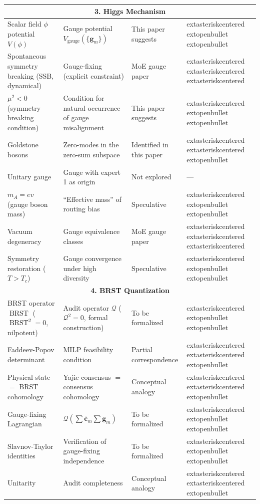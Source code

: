 \documentclass[12pt,a4paper]{article}
\theoremstyle{remark}
\newcommand{\gaugeparam}{\mathbf{g}}
\DeclareMathOperator{\BRST}{BRST}
\begin{document}
\begin{longtable}{p{4.2cm} p{5cm} p{4cm} p{2cm}}
\midrule
\multicolumn{4}{c}{\textbf{3. Higgs Mechanism}} \\
\midrule
Scalar field $\phi$ potential $V(\phi)$ & Gauge potential $V_{\text{gauge}}(\{\gaugeparam_m\})$ & This paper suggests & 	extasteriskcentered	extopenbullet	extopenbullet \\
Spontaneous symmetry breaking (SSB, dynamical) & Gauge-fixing (explicit constraint) & MoE gauge paper & 	extasteriskcentered	extasteriskcentered	extasteriskcentered \\
$\mu^2 < 0$ (symmetry breaking condition) & Condition for natural occurrence of gauge misalignment & This paper suggests & 	extasteriskcentered	extopenbullet	extopenbullet \\
Goldstone bosons & Zero-modes in the zero-sum subspace & Identified in this paper & 	extasteriskcentered	extasteriskcentered	extopenbullet \\
Unitary gauge & Gauge with expert 1 as origin & Not explored & — \\
$m_A = ev$ (gauge boson mass) & ``Effective mass'' of routing bias & Speculative & 	extasteriskcentered	extopenbullet	extopenbullet \\
Vacuum degeneracy & Gauge equivalence classes & MoE gauge paper & 	extasteriskcentered	extasteriskcentered	extasteriskcentered \\
Symmetry restoration ($T > T_c$) & Gauge convergence under high diversity & Speculative & 	extasteriskcentered	extopenbullet	extopenbullet \\

\midrule
\multicolumn{4}{c}{\textbf{4. BRST Quantization}} \\
\midrule
BRST operator $\BRST$ ($\BRST^2=0$, nilpotent) & Audit operator $\mathcal{Q}$ ($\mathcal{Q}^2=0$, formal construction) & To be formalized & 	extasteriskcentered	extopenbullet	extopenbullet \\
Faddeev-Popov determinant & MILP feasibility condition & Partial correspondence & 	extasteriskcentered	extasteriskcentered	extopenbullet \\
Physical state $=$ BRST cohomology & Yajie consensus $=$ consensus cohomology & Conceptual analogy & 	extasteriskcentered	extasteriskcentered	extopenbullet \\
Gauge-fixing Lagrangian & $\mathcal{Q}(\sum\bar{\mathbf{c}}_m\sum\gaugeparam_m)$ & To be formalized & 	extasteriskcentered	extopenbullet	extopenbullet \\
Slavnov-Taylor identities & Verification of gauge-fixing independence & To be formalized & 	extasteriskcentered	extopenbullet	extopenbullet \\
Unitarity & Audit completeness & Conceptual analogy & 	extasteriskcentered	extasteriskcentered	extopenbullet \\


\end{longtable}
\end{document}
